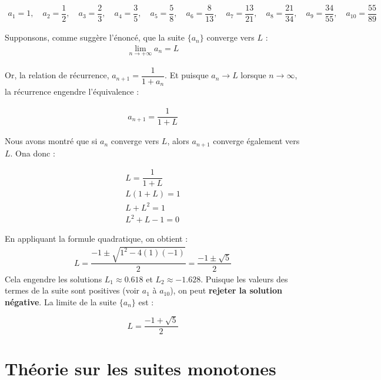 \documentclass{report}
\begin{document}
    \begin{align*}
        a_1 = 1, \quad a_2 = \dfrac{1}{2}, \quad a_3 = \dfrac{2}{3}, \quad a_4 = \dfrac{3}{5}, \quad 
        a_5 = \dfrac58, \quad a_6 = \dfrac{8}{13}, \quad
        a_7 = \dfrac{13}{21}, \quad a_8 = \dfrac{21}{34}, \quad
        a_9 = \dfrac{34}{55}, \quad a_{10} = \dfrac{55}{89}
    \end{align*}

    Supponsons, comme suggère l'énoncé, que la suite $\{ a_n \}$ converge vers $L$ :
    \begin{align*}
        \lim\limits_{n \to+\infty } a_n = L  
    \end{align*}            

    Or, la relation de récurrence, $a_{n+1} = \dfrac{1}{1 + a_n}$. Et puisque 
    $a_n \rightarrow L$ lorsque $n \to \infty$, la récurrence engendre l'équivalence :

    \begin{align*}
        a_{n+1} = \dfrac{1}{1 + L}
    \end{align*}

    Nous avons montré que si $a_n$ converge vers $L$, alors $a_{n+1}$ converge également vers $L$. 
    Ona  donc : 

    \begin{align*}
        L = \dfrac{1}{1 + L} \\ 
        L(1 + L) = 1 \\ 
        L + L^2 = 1 \\ 
        L^2 + L - 1 = 0
    \end{align*}

    En appliquant la formule quadratique, on obtient :
    \begin{align*}
        L = \dfrac{-1 \pm \sqrt{1^2 -4(1)(-1)}}{2} = \dfrac{-1\pm \sqrt{5}}{2}
    \end{align*}
    Cela engendre les solutions $L_1 \approx 0.618$ et $L_2 \approx -1.628$. Puisque les valeurs 
    des termes de la suite sont positives (voir \(a_1\) à \(a_{10} \)), on peut \textbf{rejeter la solution négative}.                 
    La limite de la suite $\{ a_n \}$ est :
    
    \[%
    \boxed{L = \dfrac{-1 + \sqrt{5}}{2}}
    \]%

    \section{Théorie sur les suites monotones}
\end{document}
